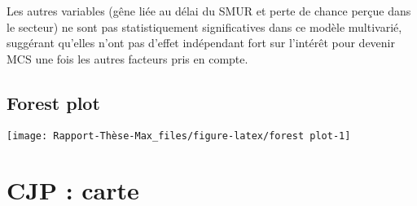 \documentclass[
]{article}
\begin{document}
Les autres variables (gêne liée au délai du SMUR et perte de chance
perçue dans le secteur) ne sont pas statistiquement significatives dans
ce modèle multivarié, suggérant qu'elles n'ont pas d'effet indépendant
fort sur l'intérêt pour devenir MCS une fois les autres facteurs pris en
compte.

\subsection{Forest plot}\label{forest-plot}

\begin{center}\texttt{[image: Rapport-Thèse-Max\_files/figure-latex/forest plot-1]} \end{center}

\section{CJP : carte}\label{cjp-carte}
\end{document}
